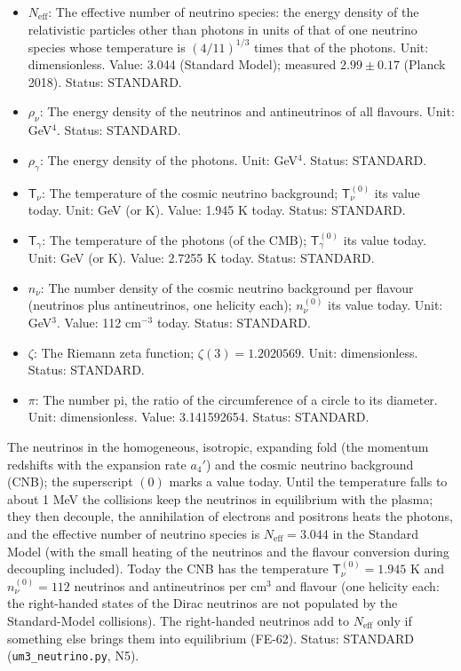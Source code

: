 \documentclass[
  10pt,
]{article}
\begin{document}
\begin{itemize}
  of momentum \(\vec p\): the rates of change of \(\varrho_{\vec p}\)
  and \(\bar\varrho_{\vec p}\) by emission, absorption, scattering and
  pair processes with the matter. Unit: GeV. Status: STANDARD.
\item
  \(N_{\mathrm{eff}}\): The effective number of neutrino species: the
  energy density of the relativistic particles other than photons in
  units of that of one neutrino species whose temperature is
  \((4/11)^{1/3}\) times that of the photons. Unit: dimensionless.
  Value: 3.044 (Standard Model); measured \(2.99 \pm 0.17\) (Planck
  2018). Status: STANDARD.
\item
  \(\rho_\nu\): The energy density of the neutrinos and antineutrinos of
  all flavours. Unit: GeV\(^4\). Status: STANDARD.
\item
  \(\rho_\gamma\): The energy density of the photons. Unit: GeV\(^4\).
  Status: STANDARD.
\item
  \(\mathsf{T}_\nu\): The temperature of the cosmic neutrino background;
  \(\mathsf{T}_\nu^{(0)}\) its value today. Unit: GeV (or K). Value:
  1.945 K today. Status: STANDARD.
\item
  \(\mathsf{T}_\gamma\): The temperature of the photons (of the CMB);
  \(\mathsf{T}_\gamma^{(0)}\) its value today. Unit: GeV (or K). Value:
  2.7255 K today. Status: STANDARD.
\item
  \(n_\nu\): The number density of the cosmic neutrino background per
  flavour (neutrinos plus antineutrinos, one helicity each);
  \(n_\nu^{(0)}\) its value today. Unit: GeV\(^3\). Value: 112
  cm\(^{-3}\) today. Status: STANDARD.
\item
  \(\zeta\): The Riemann zeta function; \(\zeta(3) = 1.2020569\). Unit:
  dimensionless. Status: STANDARD.
\item
  \(\pi\): The number pi, the ratio of the circumference of a circle to
  its diameter. Unit: dimensionless. Value: 3.141592654. Status:
  STANDARD.
\end{itemize}

The neutrinos in the homogeneous, isotropic, expanding fold (the
momentum redshifts with the expansion rate \(a_4'\)) and the cosmic
neutrino background (CNB); the superscript \((0)\) marks a value today.
Until the temperature falls to about 1 MeV the collisions keep the
neutrinos in equilibrium with the plasma; they then decouple, the
annihilation of electrons and positrons heats the photons, and the
effective number of neutrino species is \(N_{\mathrm{eff}} = 3.044\) in
the Standard Model (with the small heating of the neutrinos and the
flavour conversion during decoupling included). Today the CNB has the
temperature \(\mathsf{T}_\nu^{(0)} = 1.945\) K and \(n_\nu^{(0)} = 112\)
neutrinos and antineutrinos per cm\(^3\) and flavour (one helicity each:
the right-handed states of the Dirac neutrinos are not populated by the
Standard-Model collisions). The right-handed neutrinos add to
\(N_{\mathrm{eff}}\) only if something else brings them into equilibrium
(FE-62). Status: STANDARD (\texttt{um3\_neutrino.py}, N5).
\end{document}
